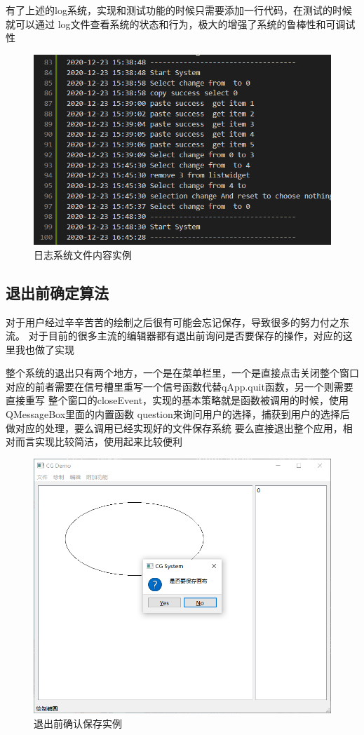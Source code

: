 \documentclass[a4paper,UTF8]{article}
\theoremstyle{definition}
\begin{document}
有了上述的log系统，实现和测试功能的时候只需要添加一行代码，在测试的时候就可以通过
log文件查看系统的状态和行为，极大的增强了系统的鲁棒性和可调试性
\begin{figure}[h]
	\centering
	\includegraphics[scale=0.4]{figure/log.png}
	\caption{日志系统文件内容实例}
	\label{fig:log}
\end{figure}

\subsection{退出前确定算法}
对于用户经过辛辛苦苦的绘制之后很有可能会忘记保存，导致很多的努力付之东流。
对于目前的很多主流的编辑器都有退出前询问是否要保存的操作，对应的这里我也做了实现

整个系统的退出只有两个地方，一个是在菜单栏里，一个是直接点击关闭整个窗口
对应的前者需要在信号槽里重写一个信号函数代替qApp.quit函数，另一个则需要直接重写
整个窗口的closeEvent，实现的基本策略就是函数被调用的时候，使用QMessageBox里面的内置函数
question来询问用户的选择，捕获到用户的选择后做对应的处理，要么调用已经实现好的文件保存系统
要么直接退出整个应用，相对而言实现比较简洁，使用起来比较便利
\begin{figure}[h]
	\centering
	\includegraphics[scale=0.4]{figure/comfirm.png}
	\caption{退出前确认保存实例}
	\label{fig:comfirmed}
\end{figure}
\end{document}
